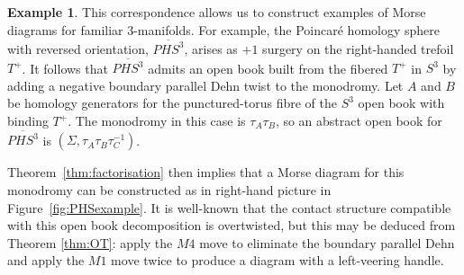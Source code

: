 \documentclass{amsart}
\theoremstyle{definition}
\newtheorem{example}[theorem]{Example}
\begin{document}
\begin{example}\label{ex:phs}
This correspondence allows us to construct examples of Morse diagrams for familiar 3-manifolds. For example, the Poincar\'{e} homology sphere with reversed orientation, $\overline{PHS^{3}}$, arises as $+1$ surgery on the right-handed trefoil $T^{+}$.  It follows that  $\overline{PHS^{3}}$ admits an open book built from the fibered $T^{+}$ in $S^{3}$  by adding a negative boundary parallel Dehn twist to the monodromy.   Let $A$ and $B$ be homology generators  for the punctured-torus fibre of the $S^3$ open book with binding $T^+$.  The monodromy in this case is $\tau_{A}\tau_{B}$, so an abstract open book for $\overline{PHS^{3}}$ is $(\Sigma,\tau_{A}\tau_{B}\tau_{C}^{-1})$. 

Theorem~\ref{thm:factorisation} then implies that a Morse diagram for this monodromy can be constructed as in right-hand picture in Figure~\ref{fig:PHSexample}.
 It is well-known that the contact structure compatible with this open book decomposition is overtwisted, but this may be deduced from Theorem \ref{thm:OT}: apply the $M4$ move to eliminate the boundary parallel Dehn and apply the $M1$ move twice to produce a diagram with a left-veering handle.
\end{example}









\end{document}
